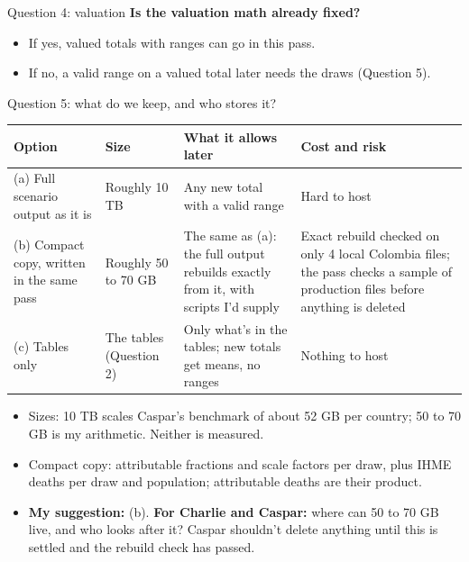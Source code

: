 \documentclass[aspectratio=169,11pt]{beamer}
\begin{document}
\begin{frame}{Question 4: valuation}
  \large
  \medskip
  \textbf{Is the valuation math already fixed?}

  \bigskip\normalsize
  \begin{itemize}
    \item If yes, valued totals with ranges can go in this pass.
    \item If no, a valid range on a valued total later needs the draws (Question 5).
  \end{itemize}
\end{frame}

\begin{frame}{Question 5: what do we keep, and who stores it?}
  \scriptsize
  \centering
  \renewcommand{\arraystretch}{0.95}
  \begin{tabular}{L{0.20\textwidth}L{0.12\textwidth}L{0.29\textwidth}L{0.27\textwidth}}
    \toprule
    Option & Size & What it allows later & Cost and risk \\
    \midrule
    (a) Full scenario output as it is & Roughly 10 TB & Any new total with a valid range & Hard to host \\
    \midrule
    (b) Compact copy, written in the same pass & Roughly 50 to 70 GB & The same as (a): the full output rebuilds exactly from it, with scripts I'd supply & Exact rebuild checked on only 4 local Colombia files; the pass checks a sample of production files before anything is deleted \\
    \midrule
    (c) Tables only & The tables (Question 2) & Only what's in the tables; new totals get means, no ranges & Nothing to host \\
    \bottomrule
  \end{tabular}

  \medskip
  \raggedright\footnotesize
  \begin{itemize}
    \item Sizes: 10 TB scales Caspar's benchmark of about 52 GB per country; 50 to 70 GB is my arithmetic. Neither is measured.
    \item Compact copy: attributable fractions and scale factors per draw, plus IHME deaths per draw and population; attributable deaths are their product.
    \item \textbf{My suggestion:} (b). \textbf{For Charlie and Caspar:} where can 50 to 70 GB live, and who looks after it? Caspar shouldn't delete anything until this is settled and the rebuild check has passed.
  \end{itemize}
\end{frame}
\end{document}
